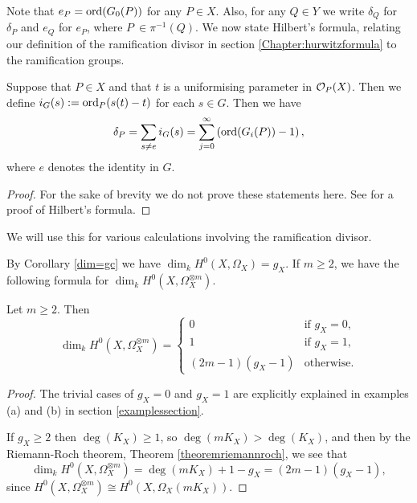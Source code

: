 Note that $e_P = \operatorname{ord} (G_0(P))$ for any $P \in X$.
Also, for any $Q \in Y$ we write $\delta_Q$ for $\delta_P$ and $e_Q$ for $e_P$, where $P\ \in \pi^{-1}(Q)$.
We now state Hilbert's formula, relating our definition of the ramification divisor in section \ref{Chapter:hurwitzformula} to the ramification groups.


    \begin{thm}\label{hilbertsformula}
    Suppose that $P\in X$ and that $t$ is a uniformising parameter in ${\cal O}_{P}(X)$.
    Then we define $i_G(s):=\operatorname{ord}_{P}(s(t)-t)$ for each $s\in G$.
    Then we have
        \begin{equation}
        \delta_P = \sum_{s\neq e}i_G(s)=\sum_{j=0}^{\infty}\left(\operatorname{ord}(G_i(P))-1\right),\label{ramdiv}
        \end{equation}
    where $e$ denotes the identity in $G$.
    \end{thm}
    \begin{proof}
    For the sake of brevity we do not prove these statements here. See \cite[Chap. IV, \S 1, Prop. 4]{localfields} for a proof of Hilbert's formula.
    \end{proof}

We will use this for various calculations involving the ramification divisor.


By Corollary \ref{dim=gc} we have $\dim_kH^0(X,\Omega_X)=g_X$.
If $m\geq 2$, we have the following formula for $\dim_kH^0(X,\Omega_X^{\otimes m})$.



    \begin{lem}\label{dim3}
    Let $m\geq 2$. Then
        \begin{equation}
        \dim_kH^0(X,\Omega_X^{\otimes m}) =
            \begin{cases}
            0 & \mbox{if } g_X=0,\\
            1 & \mbox{if } g_X=1,\\
            (2m-1)(g_X-1) & \mbox{otherwise}.
            \end{cases}
        \end{equation}
    \end{lem}
    \begin{proof}
    The trivial cases of $g_X =0$ and $g_X=1$ are explicitly explained in examples (a) and (b) in section \ref{examplessection}.
    
    If $g_X\geq 2$ then $\deg(K_X)\geq1$, so $\deg(mK_X)>\deg(K_X)$, and then by the Riemann-Roch theorem, Theorem \ref{theoremriemannroch}, we see that 
        \[
        \dim_kH^0(X,\Omega_X^{\otimes m})=\deg(mK_X)+1-g_X=(2m-1)(g_X-1),
        \]
    since $H^0(X,\Omega_X^{\otimes m}) \cong H^0(X,\Omega_X(mK_X))$.
    \end{proof}

